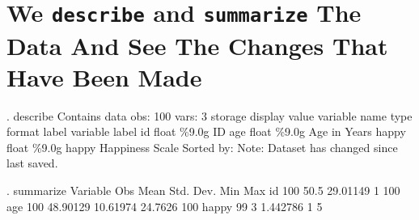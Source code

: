 \documentclass[]{article}
\begin{document}
\section{\texorpdfstring{We \texttt{describe} and \texttt{summarize} The
Data And See The Changes That Have Been
Made}{We describe and summarize The Data And See The Changes That Have Been Made}}\label{we-describe-and-summarize-the-data-and-see-the-changes-that-have-been-made}

\begin{stlog}
. describe
{\smallskip}
Contains data
  obs:           100                          
 vars:             3                          
              storage   display    value
variable name   type    format     label      variable label
id              float   \%9.0g                 ID
age             float   \%9.0g                 Age in Years
happy           float   \%9.0g      happy      Happiness Scale
Sorted by: 
     Note: Dataset has changed since last saved.
\end{stlog}

\begin{stlog}
. summarize
{\smallskip}
    Variable {\VBAR}        Obs        Mean    Std. Dev.       Min        Max
          id {\VBAR}        100        50.5    29.01149          1        100
         age {\VBAR}        100    48.90129    10.61974    24.7626        100
       happy {\VBAR}         99           3    1.442786          1          5
\end{stlog}
\end{document}
